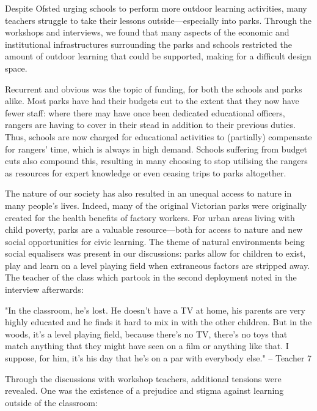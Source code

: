 Despite Ofsted urging schools to perform more outdoor learning activities, many teachers struggle to take their lessons outside—especially into parks. Through the workshops and interviews, we found that many aspects of the economic and institutional infrastructures surrounding the parks and schools restricted the amount of outdoor learning that could be supported, making for a difficult design space.

Recurrent and obvious was the topic of funding, for both the schools and parks alike. Most parks have had their budgets cut to the extent that they now have fewer staff: where there may have once been dedicated educational officers, rangers are having to cover in their stead in addition to their previous duties. Thus, schools are now charged for educational activities to (partially) compensate for rangers’ time, which is always in high demand. Schools suffering from budget cuts also compound this, resulting in many choosing to stop utilising the rangers as resources for expert knowledge or even ceasing trips to parks altogether.

The nature of our society has also resulted in an unequal access to nature in many people’s lives. Indeed, many of the original Victorian parks were originally created for the health benefits of factory workers. For urban areas living with child poverty, parks are a valuable resource—both for access to nature and new social opportunities for civic learning. The theme of natural environments being social equalisers was present in our discussions: parks allow for children to exist, play and learn on a level playing field when extraneous factors are stripped away. The teacher of the class which partook in the second deployment noted in the interview afterwards:

\begin{displayquote}
"In the classroom, he's lost. He doesn't have a TV at home, his parents are very highly educated and he finds it hard to mix in with the other children. But in the woods, it's a level playing field, because there's no TV, there's no toys that match anything that they might have seen on a film or anything like that. I suppose, for him, it’s his day that he’s on a par with everybody else." – Teacher 7
\end{displayquote}

Through the discussions with workshop teachers, additional tensions were revealed.  One was the existence of a prejudice and stigma against learning outside of the classroom:

